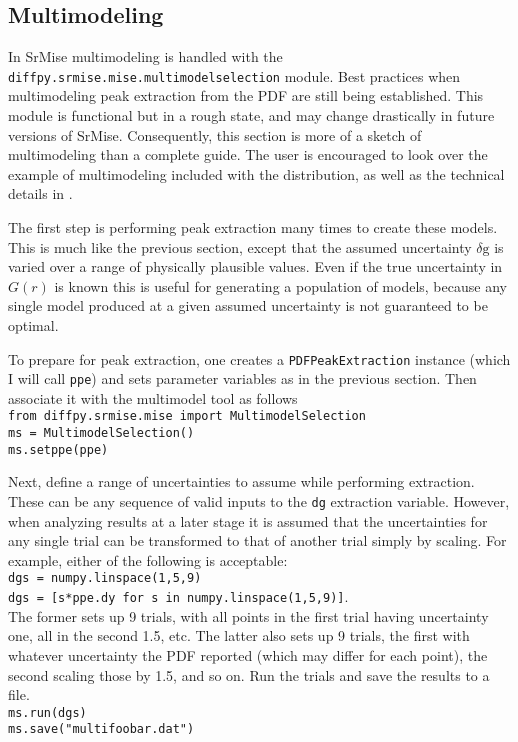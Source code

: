 \documentclass[12pt]{article}
\newcommand{\dg}{\ensuremath{\delta\mathrm{g}}}
\begin{document}
\subsection{Multimodeling}

In {\sc SrMise} multimodeling is handled with the \texttt{diffpy.srmise.mise.multimodelselection} module.  Best practices when multimodeling peak extraction from the PDF are still being established.  This module is functional but in a rough state, and may change drastically in future versions of {\sc SrMise}.  Consequently, this section is more of a sketch of multimodeling than a complete guide.  The user is encouraged to look over the example of multimodeling included with the distribution, as well as the technical details in .

The first step is performing peak extraction many times to create these models.  This is much like the previous section, except that the assumed uncertainty $\dg$ is varied over a range of physically plausible values.  Even if the true uncertainty in $G(r)$ is known this is useful for generating a population of models, because any single model produced at a given assumed uncertainty is not guaranteed to be optimal.

To prepare for peak extraction, one creates a \texttt{PDFPeakExtraction} instance (which I will call \texttt{ppe}) and sets parameter variables as in the previous section.  Then associate it with the multimodel tool as follows\\
\texttt{from diffpy.srmise.mise import MultimodelSelection}\\
\texttt{ms = MultimodelSelection()}\\
\texttt{ms.setppe(ppe)}

Next, define a range of uncertainties to assume while performing extraction.  These can be any sequence of valid inputs to the \texttt{dg} extraction variable.  However, when analyzing results at a later stage it is assumed that the uncertainties for any single trial can be transformed to that of another trial simply by scaling.  For example, either of the following is acceptable:\\
\texttt{dgs = numpy.linspace(1,5,9)}\\
\texttt{dgs = [s*ppe.dy for s in numpy.linspace(1,5,9)]}.\\
The former sets up 9 trials, with all points in the first trial having uncertainty one, all in the second 1.5, etc.  The latter also sets up 9 trials, the first with whatever uncertainty the PDF reported (which may differ for each point), the second scaling those by 1.5, and so on.  Run the trials and save the results to a file.\\
\texttt{ms.run(dgs)}\\
\texttt{ms.save("multifoobar.dat")}
\end{document}
